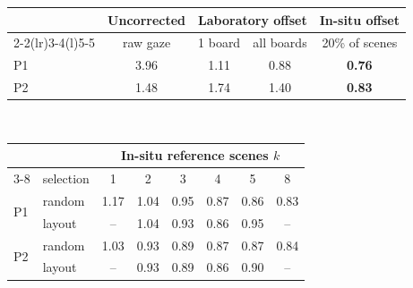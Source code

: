 \begin{tabular}{@{}l@{\hskip 4pt}c@{\hskip 6pt}cc@{\hskip 6pt}c@{}}
\toprule
 & \multicolumn{1}{c}{Uncorrected} & \multicolumn{2}{c}{Laboratory offset} & In-situ offset \\
\cmidrule(lr){2-2}\cmidrule(lr){3-4}\cmidrule(l){5-5}
 & raw gaze & 1 board & all boards & 20\% of scenes \\
\midrule
P1 & 3.96 & 1.11 & 0.88 & \textbf{0.76} \\
P2 & 1.48 & 1.74 & 1.40 & \textbf{0.83} \\
\bottomrule
\end{tabular}
\\[4pt]
\begin{tabular}{@{}ll@{\hskip 6pt}cccccc@{}}
\toprule
 & & \multicolumn{6}{c}{In-situ reference scenes $k$} \\
\cmidrule(l){3-8}
 & selection & 1 & 2 & 3 & 4 & 5 & 8 \\
\midrule
\multirow{2}{*}{P1} & random & 1.17 & 1.04 & 0.95 & 0.87 & 0.86 & 0.83 \\
 & layout & -- & 1.04 & 0.93 & 0.86 & 0.95 & -- \\
\multirow{2}{*}{P2} & random & 1.03 & 0.93 & 0.89 & 0.87 & 0.87 & 0.84 \\
 & layout & -- & 0.93 & 0.89 & 0.86 & 0.90 & -- \\
\bottomrule
\end{tabular}
